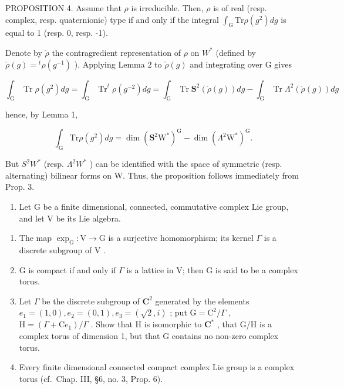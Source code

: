PROPOSITION 4. Assume that \(\rho\) is irreducible. Then, \(\rho\) is of real (resp. complex, resp. quaternionic) type if and only if the integral \(\int_{\mathrm{G}} \mathrm{Tr} \rho(g^2) dg\) is equal to 1 (resp. 0, resp. -1).

Denote by \(\check{\rho}\) the contragredient representation of \(\rho\) on \(W^{*}\) (defined by \(\check{\rho}(g)={}^{t}\rho(g^{-1})\) ). Applying Lemma 2 to \(\check{\rho}(g)\) and integrating over G gives

\[
\int_ {\mathrm{G}} \operatorname{Tr} \rho (g ^ {2}) d g = \int_ {\mathrm{G}} \operatorname{Tr} ^ {t} \rho (g ^ {- 2}) d g = \int_ {\mathrm{G}} \operatorname{Tr} \mathbf {S} ^ {2} (\check {\rho} (g)) d g - \int_ {\mathrm{G}} \operatorname{Tr} \Lambda^ {2} (\check {\rho} (g)) d g
\]

hence, by Lemma 1,

\[
\int_ {\mathrm{G}} \mathrm{Tr} \rho (g ^ {2}) d g = \dim (\mathbf {S} ^ {2} \mathrm{W} ^ {*}) ^ {\mathrm{G}} - \dim (\Lambda^ {2} \mathrm{W} ^ {*}) ^ {\mathrm{G}}.
\]

But \(S^{2}W^{*}\) (resp. \(\Lambda^{2}W^{*}\) ) can be identified with the space of symmetric (resp. alternating) bilinear forms on W. Thus, the proposition follows immediately from Prop. 3.



\begin{enumerate}
\def\labelenumi{\arabic{enumi})}
\tightlist
\item
  Let \(\mathrm{G}\) be a finite dimensional, connected, commutative complex Lie group, and let \(\mathrm{V}\) be its Lie algebra.
\end{enumerate}

\begin{enumerate}
\def\labelenumi{\alph{enumi})}
\item
  The map \(\exp_{\mathrm{G}}: \mathrm{V} \to \mathrm{G}\) is a surjective homomorphism; its kernel \(\Gamma\) is a discrete subgroup of \(\mathrm{V}\) .
\item
  G is compact if and only if \(\Gamma\) is a lattice in V; then G is said to be a complex torus.
\item
  Let \(\Gamma\) be the discrete subgroup of \(\mathbf{C}^2\) generated by the elements \(e_1 = (1,0), e_2 = (0,1), e_3 = (\sqrt{2},i)\) ; put \(\mathrm{G} = \mathrm{C}^2 / \Gamma\) , \(\mathrm{H} = (\Gamma + \mathrm{C}e_1) / \Gamma\) . Show that H is isomorphic to \(\mathbf{C}^*\) , that G/H is a complex torus of dimension 1, but that G contains no non-zero complex torus.
\item
  Every finite dimensional connected compact complex Lie group is a complex torus (cf.~Chap. III, §6, no. 3, Prop. 6).
\end{enumerate}


